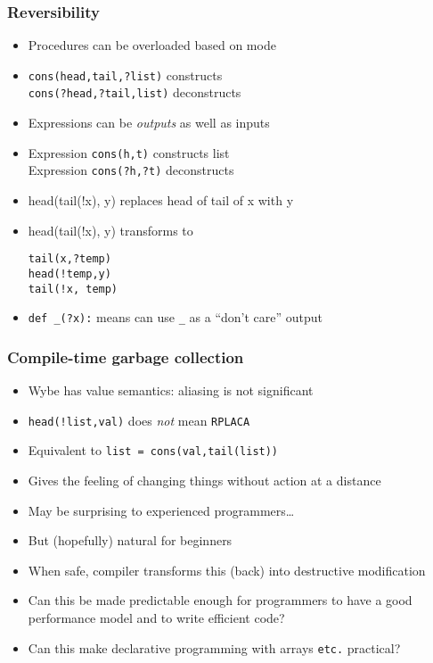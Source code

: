 \documentclass[12pt]{beamer}
\begin{document}
\begin{frame}
\frametitle{Reversibility}
\begin{itemize}
\item Procedures can be overloaded based on mode
\item \texttt{cons(head,tail,?list)}  constructs \\
\texttt{cons(?head,?tail,list)}  deconstructs \\
\item Expressions can be \emph{outputs} as well as inputs
\item Expression \texttt{cons(h,t)} constructs list \\
Expression \texttt{cons(?h,?t)} deconstructs
\item head(tail(!x), y) replaces head of tail of x with y
\item head(tail(!x), y) \quad transforms to \quad
  \begin{minipage}[c]{0.4\linewidth}
  \texttt{tail(x,?temp)} \\
  \texttt{head(!temp,y)} \\
  \texttt{tail(!x, temp)}
  \end{minipage}
\item \texttt{def \_(?x):} means can use \texttt{\_} as a ``don't
  care'' output
\end{itemize}
\end{frame}


\begin{frame}
\frametitle{Compile-time garbage collection}
\begin{itemize}
\item Wybe has value semantics:  aliasing is not significant
\item \texttt{head(!list,val)} does \emph{not} mean \texttt{RPLACA}
\item Equivalent to \texttt{list = cons(val,tail(list))}
\item Gives the feeling of changing things without action at a distance
\item May be surprising to experienced programmers\ldots
\item But (hopefully) natural for beginners
\item When safe, compiler transforms this (back) into destructive
  modification
\item Can this be made predictable enough for programmers
  to have a good performance model and to write efficient code?
\item Can this make declarative programming with arrays \texttt{etc.} practical?
\end{itemize}
\end{frame}
\end{document}
